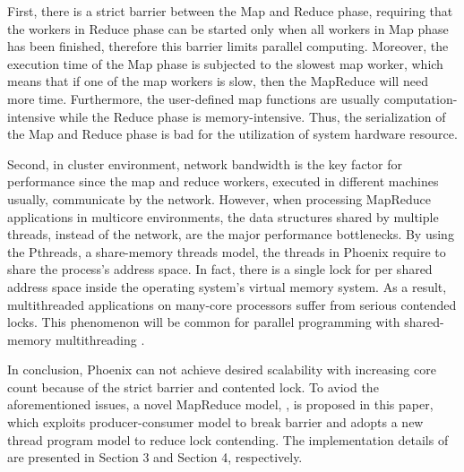 First, there is a strict barrier between the Map and Reduce phase,
requiring that the workers in Reduce phase can
be started only when all workers in Map phase has been finished, 
therefore this barrier limits parallel computing.
Moreover,  the execution time of the Map phase is subjected to the slowest map worker, which means that if one of the map workers is slow, then the MapReduce will need more time.
Furthermore, the user-defined map functions are usually computation-intensive while the Reduce phase is memory-intensive. Thus, the serialization of the Map and Reduce phase is bad for the utilization of system hardware resource.

Second,  in cluster environment, network bandwidth is the key factor for performance since the map and reduce workers, executed in different machines usually,  communicate by the network.
However, when processing MapReduce applications in multicore environments,  the data structures shared by multiple threads, instead of the network, are the major performance bottlenecks.
By using the Pthreads,  a share-memory threads model, 
the threads in Phoenix require to share the process's address space.
In fact, there is a single lock for per shared address space inside the operating system’s virtual memory system. 
As a result, multithreaded applications on many-core processors suffer from serious contended locks.
This phenomenon will be common for parallel programming with shared-memory
multithreading \cite{clements2013radixvm}.


In conclusion, Phoenix can not achieve desired scalability with increasing core count because of the strict barrier and contented lock.
To aviod the aforementioned issues, a novel MapReduce model, \myds,  is proposed in this paper,
which exploits producer-consumer model to break barrier
and adopts a new thread program model to reduce lock contending.
The implementation details of \myds are presented in Section 3 and Section 4, respectively.  





